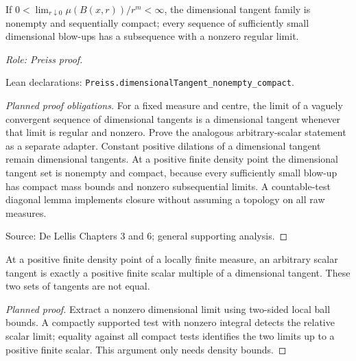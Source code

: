 \begin{lemma}
\label{lem:dimensional-tangent-compactness}







If $0<\lim_{r\downarrow0}\mu(B(x,r))/r^m<\infty$, the dimensional tangent family is nonempty and sequentially compact; every sequence of sufficiently small dimensional blow-ups has a subsequence with a nonzero regular limit.
\par\emph{Role: Preiss proof.}
\par Lean declarations: \texttt{Preiss.dimensionalTangent\_nonempty\_compact}.
\end{lemma}
\begin{proof}[Planned proof obligations]

For a fixed measure and centre, the limit of a vaguely convergent sequence of
dimensional tangents is a dimensional tangent whenever that limit is regular
and nonzero. Prove the analogous arbitrary-scalar statement as a separate
adapter. Constant positive dilations of a dimensional tangent remain dimensional
tangents. At a positive finite density point the dimensional tangent set is
nonempty and compact, because every sufficiently small blow-up has compact
mass bounds and nonzero subsequential limits. A countable-test diagonal lemma
implements closure without assuming a topology on all raw measures.
\par Source: De Lellis Chapters 3 and 6; general supporting analysis.
\end{proof}

\begin{lemma}
\label{lem:tangent-ray}











At a positive finite density point of a locally finite measure, an arbitrary
scalar tangent is exactly a positive finite scalar multiple of a dimensional
tangent. These two sets of tangents are not equal.
\end{lemma}
\begin{proof}[Planned proof]

Extract a nonzero dimensional limit using two-sided local ball bounds.
A compactly supported test with nonzero integral detects the relative scalar
limit; equality against all compact tests identifies the two limits up to
a positive finite scalar. This argument only needs density bounds.
\end{proof}

